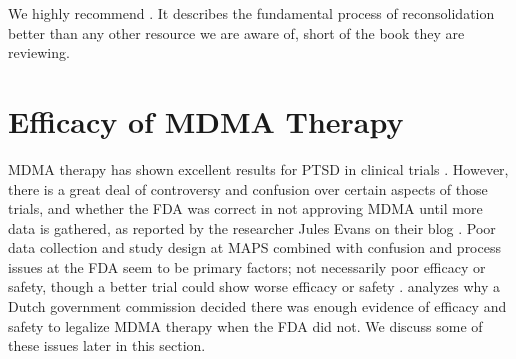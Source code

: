 \documentclass[12pt,letterpaper]{book}
\begin{document}
We highly recommend \textcite{lesswrongCoherenceTherapy}. It describes the fundamental process of reconsolidation better than any other resource we are aware of, short of the book they are reviewing.

\section{Efficacy of MDMA Therapy}
MDMA therapy has shown excellent results for PTSD in clinical trials \cite{mitchellMDMAClinicalTrial,mitchellMDMAClinicalTrial2}. However, there is a great deal of controversy and confusion over certain aspects of those trials, and whether the FDA was correct in not approving MDMA until more data is gathered, as reported by the researcher Jules Evans on their blog \textcite{evansBlame}. Poor data collection and study design at MAPS combined with confusion and process issues at the FDA seem to be primary factors; not necessarily poor efficacy or safety, though a better trial could show worse efficacy or safety \cite{evansBlame}. \textcite{fdaVSdutch} analyzes why a Dutch government commission decided there was enough evidence of efficacy and safety to legalize MDMA therapy when the FDA did not. We discuss some of these issues later in this section.
\end{document}
